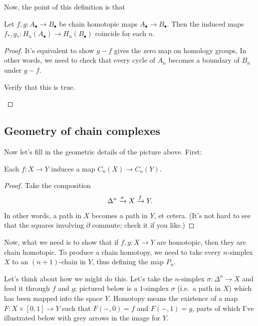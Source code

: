 Now, the point of this definition is that
\begin{proposition}
	Let $f, g: A_\bullet \to B_\bullet$ be chain homotopic maps $A_\bullet \to B_\bullet$.
	Then the induced maps $f_\ast, g_\ast \colon H_n(A_\bullet) \to H_n(B_\bullet)$ coincide for each $n$.
\end{proposition}
\begin{proof}
	It's equivalent to show $g-f$ gives the zero map on homology groups,
	In other words, we need to check that every cycle of $A_n$ becomes
	a boundary of $B_n$ under $g-f$.
	\begin{ques}
		Verify that this is true. \qedhere
	\end{ques}
\end{proof}


\subsection{Geometry of chain complexes}
Now let's fill in the geometric details of the picture above.
First:
\begin{lemma}
	Each $f \colon X \to Y$ induces a map $C_n(X) \to C_n(Y)$.
\end{lemma}
\begin{proof}
	Take the composition
	\[ \Delta^n \xrightarrow{\sigma} X \xrightarrow{f} Y. \]
	In other words, a path in $X$ becomes a path in $Y$, et cetera.
	(It's not hard to see that the squares involving $\partial$ commute;
	check it if you like.)
\end{proof}

Now, what we need is to show that if $f, g \colon X \to Y$ are homotopic,
then they are chain homotopic.
To produce a chain homotopy, we need to take every $n$-simplex $X$
to an $(n+1)$-chain in $Y$, thus defining the map $P_n$.

Let's think about how we might do this. Let's take the $n$-simplex $\sigma \colon \Delta^n \to X$
and feed it through $f$ and $g$; pictured below is a $1$-simplex $\sigma$ (i.e.\ a path in $X$)
which has been mapped into the space $Y$.
Homotopy means the existence of a map $F \colon X \times [0,1] \to Y$
such that $F(-,0) = f$ and $F(-,1) = g$, parts of which I've illustrated below with grey arrows
in the image for $Y$.

